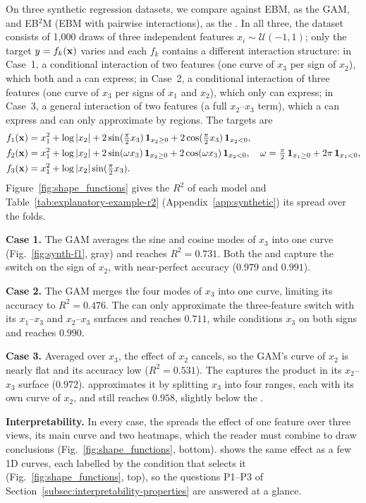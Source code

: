 On three synthetic regression datasets, we compare \method{} against EBM, as the GAM, and EB$^2$M (EBM with pairwise interactions), as the \gamm{}.
In all three, the dataset consists of 1{,}000 draws of three independent features $x_i \sim \mathcal{U}(-1, 1)$; only the target $y=f_k(\mathbf{x})$ varies and each $f_k$ contains a different interaction structure:
in Case~1, a conditional interaction of two features (one curve of $x_3$ per sign of $x_2$), which both \method{} and a \gamm{} can express;
in Case~2, a conditional interaction of three features (one curve of $x_3$ per signs of $x_1$ and $x_2$), which only \method{} can express;
in Case~3, a general interaction of two features (a full $x_2$–$x_3$ term), which a \gamm{} can express and \method{} can only approximate by regions.
The targets are
\begin{align*}
f_1(\mathbf{x}) &= x_1^2 + \log|x_2| + 2\sin(\tfrac{\pi}{2} x_3)\,\mathbf{1}_{x_2 \geq 0} + 2\cos(\tfrac{\pi}{2} x_3)\,\mathbf{1}_{x_2 < 0}, \\
f_2(\mathbf{x}) &= x_1^2 + \log|x_2| + 2\sin(\omega x_3)\,\mathbf{1}_{x_2 \geq 0} + 2\cos(\omega x_3)\,\mathbf{1}_{x_2 < 0}, \quad \omega = \tfrac{\pi}{2}\,\mathbf{1}_{x_1 \geq 0} + 2\pi\,\mathbf{1}_{x_1 < 0}, \\
f_3(\mathbf{x}) &= x_1^2 + \log|x_2| \sin(\tfrac{\pi}{2} x_3).
\end{align*}
Figure~\ref{fig:shape_functions} gives the $R^2$ of each model and Table~\ref{tab:explanatory-example-r2} (Appendix~\ref{app:synthetic}) its spread over the folds.

\textbf{Case 1.}
The GAM averages the sine and cosine modes of $x_3$ into one curve (Fig.~\ref{fig:synth-f1}, gray) and reaches $R^2 = 0.731$.
Both the \gamm{} and \method{} capture the switch on the sign of $x_2$, with near-perfect accuracy ($0.979$ and $0.991$).

\textbf{Case 2.}
The GAM merges the four modes of $x_3$ into one curve, limiting its accuracy to $R^2 = 0.476$.
The \gamm{} can only approximate the three-feature switch with its $x_1$–$x_3$ and $x_2$–$x_3$ surfaces and reaches $0.711$, while \method{} conditions $x_3$ on both signs and reaches $0.990$.

\textbf{Case 3.}
Averaged over $x_3$, the effect of $x_2$ cancels, so the GAM's curve of $x_2$ is nearly flat and its accuracy low ($R^2 = 0.531$).
The \gamm{} captures the product in its $x_2$–$x_3$ surface ($0.972$).
\method{} approximates it by splitting $x_3$ into four ranges, each with its own curve of $x_2$, and still reaches $0.958$, slightly below the \gamm{}.

\textbf{Interpretability.}
In every case, the \gamm{} spreads the effect of one feature over three views, its main curve and two heatmaps, which the reader must combine to draw conclusions (Fig.~\ref{fig:shape_functions}, bottom).
\method{} shows the same effect as a few 1D curves, each labelled by the condition that selects it (Fig.~\ref{fig:shape_functions}, top), so the questions P1--P3 of Section~\ref{subsec:interpretability-properties} are answered at a glance.
